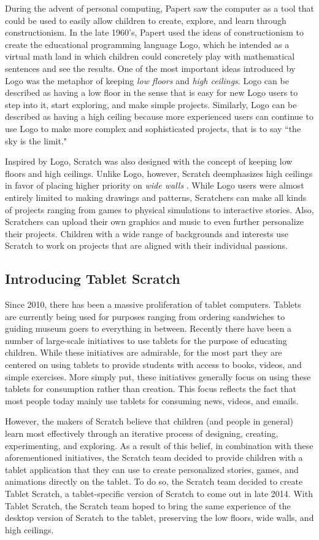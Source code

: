 During the advent of personal computing, Papert saw the computer as a tool that could be used to easily allow children to create, explore, and learn through constructionism. In the late 1960's, Papert used the ideas  of constructionism to create the educational programming language Logo, which he intended as a virtual math land in which children could concretely play with mathematical sentences and see the results. One of the most important ideas introduced by Logo was the metaphor of keeping \emph{low floors} and \emph{high ceilings}. Logo can be described as having a low floor in the sense that is easy for new Logo users to step into it, start exploring, and make simple projects. Similarly, Logo can be described as having a high ceiling because more experienced users can continue to use Logo to make more complex and sophisticated projects, that is to say ``the sky is the limit."

Inspired by Logo, Scratch was also designed with the concept of keeping low floors and high ceilings. Unlike Logo, however, Scratch deemphasizes high ceilings in favor of placing higher priority on \emph{wide walls} \cite{Reflections}. While Logo users were almost entirely limited to making drawings and patterns, Scratchers can make all kinds of projects ranging from games to physical simulations to interactive stories. Also, Scratchers can upload their own graphics and music to even further personalize their projects. Children with a wide range of backgrounds and interests use Scratch to work on projects that are aligned with their individual passions.

\subsection{Introducing Tablet Scratch}
Since 2010, there has been a massive proliferation of tablet computers. Tablets are currently being used for purposes ranging from ordering sandwiches to guiding museum goers to everything in between. Recently there have been a number of large-scale initiatives to use tablets for the purpose of educating children. While these initiatives are admirable, for the most part they are centered on using tablets to provide students with access to books, videos, and simple exercises. More simply put, these initiatives generally focus on using these tablets for consumption rather than creation. This focus reflects the fact that most people today mainly use tablets for consuming news, videos, and emails.

However, the makers of Scratch believe that children (and people in general) learn most effectively through an iterative process of designing, creating, experimenting, and exploring. As a result of this belief, in combination with these aforementioned initiatives, the Scratch team decided to provide children with a tablet application that they can use to create personalized stories, games, and animations directly on the tablet. To do so, the Scratch team decided to create Tablet Scratch, a tablet-specific version of Scratch to come out in late 2014. With Tablet Scratch, the Scratch team hoped to bring the same experience of the desktop version of Scratch to the tablet, preserving the low floors, wide walls, and high ceilings.

